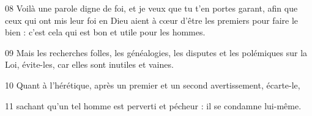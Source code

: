 
08 Voilà une parole digne de foi, et je veux que tu t’en portes garant, afin que ceux qui ont mis leur foi en Dieu aient à cœur d’être les premiers pour faire le bien : c’est cela qui est bon et utile pour les hommes.

09 Mais les recherches folles, les généalogies, les disputes et les polémiques sur la Loi, évite-les, car elles sont inutiles et vaines.

10 Quant à l’hérétique, après un premier et un second avertissement, écarte-le,

11 sachant qu’un tel homme est perverti et pécheur : il se condamne lui-même.